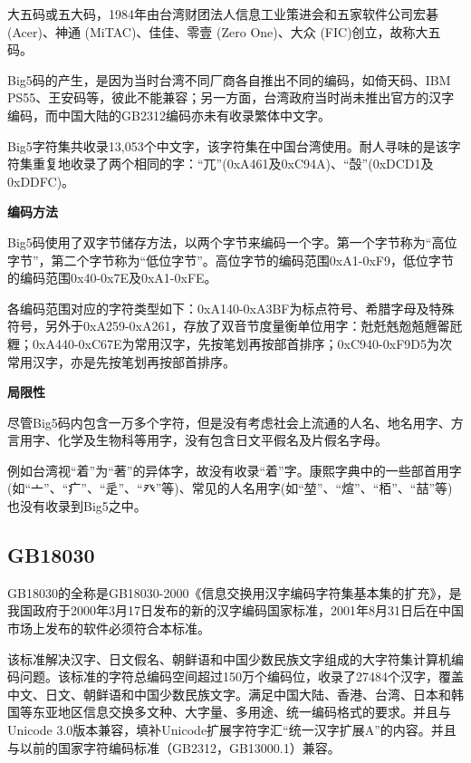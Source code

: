 \documentclass[doctor,openright,twoside]{sjtuthesis}
\theoremstyle{plain}
\theoremstyle{definition}
\theoremstyle{remark}
\theoremstyle{ocrenumbox}
\theoremstyle{plain}
\newcommand\cqh{“}
\newcommand\cqt{”}
\begin{document}
大五码或五大码，1984年由台湾财团法人信息工业策进会和五家软件公司宏碁
(Acer)、神通 (MiTAC)、佳佳、零壹 (Zero One)、大众
(FIC)创立，故称大五码。

Big5码的产生，是因为当时台湾不同厂商各自推出不同的编码，如倚天码、IBM
PS55、王安码等，彼此不能兼容；另一方面，台湾政府当时尚未推出官方的汉字编码，而中国大陆的GB2312编码亦未有收录繁体中文字。

Big5字符集共收录13,053个中文字，该字符集在中国台湾使用。耐人寻味的是该字符集重复地收录了两个相同的字：\cqh 兀\cqt (0xA461及0xC94A)、\cqh 嗀\cqt (0xDCD1及0xDDFC)。

\textbf{编码方法}

Big5码使用了双字节储存方法，以两个字节来编码一个字。第一个字节称为\cqh 高位字节\cqt ，第二个字节称为\cqh 低位字节\cqt 。高位字节的编码范围0xA1-0xF9，低位字节的编码范围0x40-0x7E及0xA1-0xFE。

各编码范围对应的字符类型如下：0xA140-0xA3BF为标点符号、希腊字母及特殊符号，另外于0xA259-0xA261，存放了双音节度量衡单位用字：兙兛兞兝兡兣嗧瓩糎；0xA440-0xC67E为常用汉字，先按笔划再按部首排序；0xC940-0xF9D5为次常用汉字，亦是先按笔划再按部首排序。

\textbf{局限性}

尽管Big5码内包含一万多个字符，但是没有考虑社会上流通的人名、地名用字、方言用字、化学及生物科等用字，没有包含日文平假名及片假名字母。

例如台湾视\cqh 着\cqt 为\cqh 著\cqt 的异体字，故没有收录\cqh 着\cqt 字。康熙字典中的一些部首用字(如\cqh 亠\cqt 、\cqh 疒\cqt 、\cqh 辵\cqt 、\cqh 癶\cqt 等)、常见的人名用字(如\cqh 堃\cqt 、\cqh 煊\cqt 、\cqh 栢\cqt 、\cqh 喆\cqt 等)
也没有收录到Big5之中。

\hypertarget{gb18030}{%
\subsection{GB18030}\label{gb18030}}

GB18030的全称是GB18030-2000《信息交换用汉字编码字符集基本集的扩充》，是我国政府于2000年3月17日发布的新的汉字编码国家标准，2001年8月31日后在中国市场上发布的软件必须符合本标准。

该标准解决汉字、日文假名、朝鲜语和中国少数民族文字组成的大字符集计算机编码问题。该标准的字符总编码空间超过150万个编码位，收录了27484个汉字，覆盖中文、日文、朝鲜语和中国少数民族文字。满足中国大陆、香港、台湾、日本和韩国等东亚地区信息交换多文种、大字量、多用途、统一编码格式的要求。并且与Unicode
3.0版本兼容，填补Unicode扩展字符字汇\cqh 统一汉字扩展A\cqt 的内容。并且与以前的国家字符编码标准（GB2312，GB13000.1）兼容。
\end{document}
